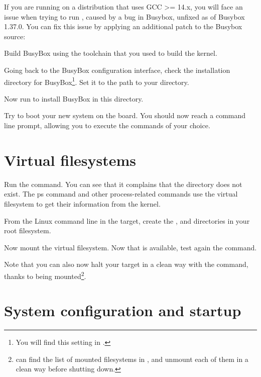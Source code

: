 If you are running on a distribution that uses GCC >= 14.x, you will
face an issue when trying to run , caused by a
bug in Busybox, unfixed as of Busybox 1.37.0. You can fix this issue
by applying an additional patch to the Busybox source:


Build BusyBox using the toolchain that you used to build the kernel.

Going back to the BusyBox configuration interface,
check the installation directory for BusyBox\footnote{You will find
this setting in
.}.
Set it to the path to your  directory.

Now run  to install BusyBox in this directory.

Try to boot your new system on the board. You should now reach a
command line prompt, allowing you to execute the commands of your
choice.

\section{Virtual filesystems}

Run the  command. You can see that it complains that the
 directory does not exist. The ps command and other
process-related commands use the  virtual filesystem to get
their information from the kernel.

From the Linux command line in the target, create the ,
 and  directories in your root filesystem.

Now mount the  virtual filesystem. Now that  is
available, test again the  command.

Note that you can also now halt your target in a clean way with the 
command, thanks to  being mounted\footnote{
can find the list of mounted filesystems in , and
unmount each of them in a clean way before shutting down.}.

\section{System configuration and startup}

